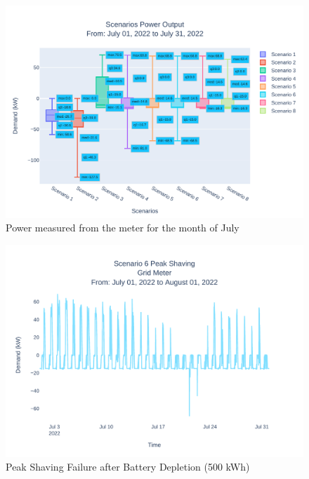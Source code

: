 \documentclass[conference]{IEEEtran}
\begin{document}
	\begin{figure}
		\centering
		\includegraphics[width=0.9\linewidth]{Fig/4_Scn_Output_Run_3_Jul_01_2022_to_Jul_31_2022}
		\caption{\footnotesize  Power measured from the meter for the month of July}
		\label{fig:4scnoutputrun2jul012022tojul312022}
	\end{figure}
	\begin{figure}
		\centering
		\includegraphics[width=0.9\linewidth]{Fig/scenario_6_peak_shaving}
		\caption{\footnotesize Peak Shaving Failure after Battery Depletion (500 kWh)}
		\label{fig:scenario3peakshaving}
	\end{figure}
\end{document}
